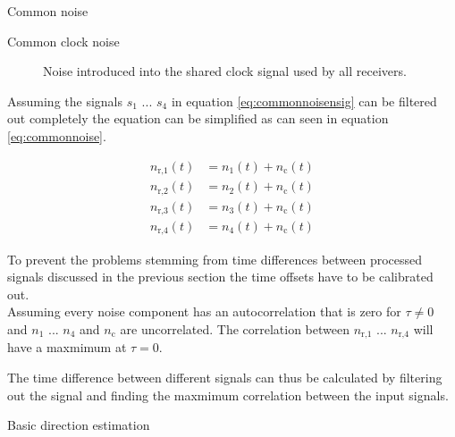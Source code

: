 \begin{subchapter}{Common noise}
\begin{description}
    \item[Common clock noise]
      Noise introduced into the shared clock signal used by all
      receivers.
  \end{description}

  Assuming the signals $s_\text{1}$ ... $s_\text{4}$ in equation
  \ref{eq:commonnoisensig} can be filtered out completely the equation
  can be simplified as can seen in equation \ref{eq:commonnoise}.

  \begin{align}
    \label{eq:commonnoise}
    n_\text{r,1}(t) &= n_\text{1}(t) + n_\text{c}(t) \\
    n_\text{r,2}(t) &= n_\text{2}(t) + n_\text{c}(t) \nonumber \\
    n_\text{r,3}(t) &= n_\text{3}(t) + n_\text{c}(t) \nonumber \\
    n_\text{r,4}(t) &= n_\text{4}(t) + n_\text{c}(t) \nonumber
  \end{align}

  To prevent the problems stemming from time differences between processed
  signals discussed in the previous section the time offsets have
  to be calibrated out. \\

  Assuming every noise component has an autocorrelation that is zero
  for $\tau \neq 0$ and $n_\text{1}$ ... $n_\text{4}$ and $n_\text{c}$
  are uncorrelated. The correlation between
  $n_\text{r,1}$ ... $n_\text{r,4}$ will have a maxmimum at $\tau = 0$.

  The time difference between different signals can thus be
  calculated by filtering out the signal and finding the
  maxmimum correlation between the input signals.
\end{subchapter}

\begin{subchapter}{Basic direction estimation}

\end{subchapter}

